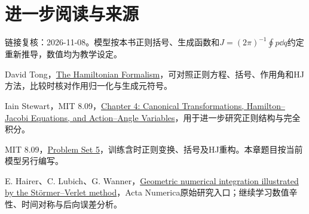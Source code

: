 \section*{进一步阅读与来源}
链接复核：2026-11-08。模型按本书正则括号、生成函数和$J=(2\pi)^{-1}\oint p\dd q$约定重新推导，数值均为教学设定。
\begin{bookreading}
\item David Tong，\href{https://davidtong.org/pdfs/teaching/classical-dynamics/clas4.pdf}{The Hamiltonian Formalism}，可对照正则方程、括号、作用角和HJ方法，比较时核对作用归一化与生成元符号。
\item Iain Stewart，MIT 8.09，\href{https://ocw.mit.edu/courses/8-09-classical-mechanics-iii-fall-2014/f00f7f68ac7ba346a0868efb7430582c_MIT8_09F14_Chapter_4.pdf}{Chapter 4: Canonical Transformations, Hamilton--Jacobi Equations, and Action--Angle Variables}，用于进一步研究正则结构与完全积分。
\item MIT 8.09，\href{https://ocw.mit.edu/courses/8-09-classical-mechanics-iii-fall-2014/a55cb49d8706f671ccfdac7c6937cddc_MIT8_09F14_pset5.pdf}{Problem Set 5}，训练含时正则变换、括号及HJ重构。本章题目按当前模型另行编写。
\item E. Hairer、C. Lubich、G. Wanner，\href{https://www.cambridge.org/core/journals/acta-numerica/article/geometric-numerical-integration-illustrated-by-the-stormerverlet-method/E55395D5DD7A4E0526D10EA74DA6C46B}{Geometric numerical integration illustrated by the Störmer--Verlet method}，Acta Numerica原始研究入口；继续学习数值辛性、时间对称与后向误差分析。
\end{bookreading}
